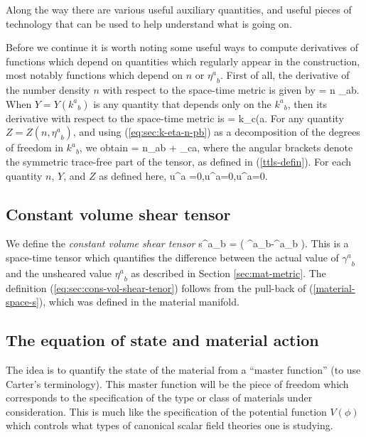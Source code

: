 Along the way there are various useful auxiliary quantities, and useful pieces of technology that can be used to help understand what is going on.

 
 
Before we continue it is worth noting some useful ways to compute derivatives of functions which depend on quantities which regularly appear in the construction, most notably functions which depend on $n$ or ${\eta^a}_b$.
First of all, the derivative of the number density $n$ with respect to the space-time metric is given by
\bea
\label{eq:sec:dndg}
 = \half n \gamma_{ab}.
\eea
When $Y = Y({k^a}_b)$ is any quantity that depends only on the ${k^a}_b$,  then its derivative with respect to the space-time metric is
\bea
\label{eq:pd-Y-g-k}
 = k_{c(a}.
\eea
For any quantity $Z = Z(n,{\eta^a}_b)$, and using (\ref{eq:sec:k-eta-n-pb}) as a decomposition of the degrees of freedom in ${k^a}_b$, we obtain
\bea
\label{eq:sec:Zneta}
 = \half n\gamma_{ab} + \eta_{c\langle a},
\eea
where the angular brackets denote the symmetric trace-free part of the tensor, as defined in (\ref{ttls-defin}). For each quantity $n$, $Y$, and $Z$ as defined here,
\bea
u^a =0,\qquad u^a=0,\qquad u^a=0.
\eea
% 

\subsection{Constant volume shear tensor}
We define the \textit{constant  volume shear tensor}
\bea
\label{eq:sec:cons-vol-shear-tenor}
{s^a}_b = \left( {\gamma^a}_b-{\eta^a}_b \right).
\eea
This is a space-time tensor which quantifies the difference between the actual value of ${\gamma^a}_b$ and the unsheared value ${\eta^a}_b$ as described in Section \ref{sec:mat-metric}. The definition (\ref{eq:sec:cons-vol-shear-tenor}) follows from the pull-back of (\ref{material-space-s}), which was defined in the material manifold.

\subsection{The equation of state and material action}
\label{sec:eos-introd}
The idea is to quantify the state of the material  from a ``master function'' (to use Carter's terminology). This master function will be the piece of freedom which corresponds to the specification of the type or class of materials under consideration. This is much like the specification of the potential function $V(\phi)$ which controls what types of canonical scalar field theories one is studying. 

